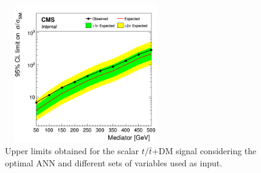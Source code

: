 \documentclass[a4paper, 10pt, openright]{report}
\begin{document}
\begin{appendices}
\begin{figure}[htbp]
{\begin{minipage}[b]{.48\textwidth}
\includegraphics[width=7cm, height=6cm]{figs/limit_ttDM_scalar__set4_DNN.png}
\end{minipage} \hfill
}
\caption{Upper limits obtained for the scalar $t/\bar t$+DM signal considering the optimal \ac{ANN} and different sets of variables used as input.}
\label{fig:optVarDNN}
\end{figure}


\end{appendices}
\end{document}
